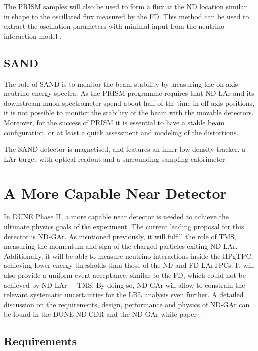The PRISM samples will also be used to form a flux at the ND location similar in shape to the oscillated flux measured by the FD. This method can be used to extract the oscillation parameters with minimal input from the neutrino interaction model \cite{Hasnip2023}.

\subsection{SAND}

The role of SAND is to monitor the beam stability by measuring the on-axis neutrino energy spectra. As the PRISM programme requires that ND-LAr and its downstream muon spectrometer spend about half of the time in off-axis positions, it is not possible to monitor the stability of the beam with the movable detectors. Moreover, for the success of PRISM it is essential to have a stable beam configuration, or at least a quick assessment and modeling of the distortions.

The SAND detector is magnetised, and features an inner low density tracker, a LAr target with optical readout and a surrounding sampling calorimeter.

\section{A More Capable Near Detector}\label{sec:mcnd}

In DUNE Phase II, a more capable near detector is needed to achieve the ultimate physics goals of the experiment. The current leading proposal for this detector is ND-GAr. As mentioned previously, it will fulfill the role of TMS, measuring the momentum and sign of the charged particles exiting ND-LAr. Additionally, it will be able to measure neutrino interactions inside the HPgTPC, achieving lower energy thresholds than those of the ND and FD LArTPCs. It will also provide a uniform event acceptance, similar to the FD, which could not be achieved by ND-LAr + TMS. By doing so, ND-GAr will allow to constrain the relevant systematic uncertainties for the LBL analysis even further. A detailed discussion on the requirements, design, performance and physics of ND-GAr can be found in the DUNE ND CDR \cite{DUNE2021NDCDR} and the ND-GAr white paper \cite{DUNE2022GArWhite}.

\subsection{Requirements}

